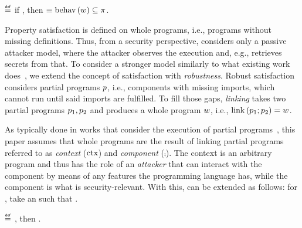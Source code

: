 \begin{definition}\label{def:propsat}
  \bul{$\sat{\wholeprogvar}{\varProp}$}
  $\isdef$
  if \iul{$\forall\trace,\tracegen{\wholeprogvar}{\trace}$},
  then \oul{$\trace\in\varProp$} $\equiv\behav{\wholeprogvar}\subseteq\varProp$.
\end{definition}

Property satisfaction is defined on whole programs, i.e., programs without missing definitions.
Thus, from a security perspective,  considers only a passive attacker model, where the attacker observes the execution and, e.g., retrieves secrets from that.
To consider a stronger model similarly to what existing work does~\cite{abate2019jour,abate2021extacc,maffeis2008code-carrying,gordon2003authenticity,fournet2007authorization,bengtson2011refine,backes2014uniontyps,michael2023mswasm,swasey2017robust,sammler2019benefits}, we extend the concept of satisfaction with {\em robustness}.
Robust satisfaction considers partial programs $\progvar$, i.e., components with missing imports, which cannot run until said imports are fulfilled.
To fill those gaps, {\em linking} takes two partial programs $\progvar[_{1}],\progvar[_{2}]$ and produces a whole program $\wholeprogvar$, i.e., $\link{\progvar[_{1}]}{\progvar[_{2}]}=\wholeprogvar$.

As typically done in works that consider the execution of partial programs~\cite{abate2019jour,devriese2018parametricity,patrignani2021rsc,korashy2021capableptrs,strydonck2019lincap,devriese2017modular,bowman2015noninterference,ahmed2011equivcps,patterson2017linkingtyps},
this paper assumes that whole programs are the result of linking partial programs referred to as {\em context} ($\ctx$) and {\em component} ($\comp$).
The context is an arbitrary program and thus has the role of an {\em attacker} that can interact with the component by means of any features the programming language has, while the component is what is security-relevant.
With this,  can be extended as follows: for , take an  such that .

\begin{definition}\label{def:proprsat}
  \bul{$\rsat{\progvar}{\varProp}$}
  $\isdef$ , then \oul{$\sat{\wholeprogvar}{\varProp}$}.
\end{definition}

